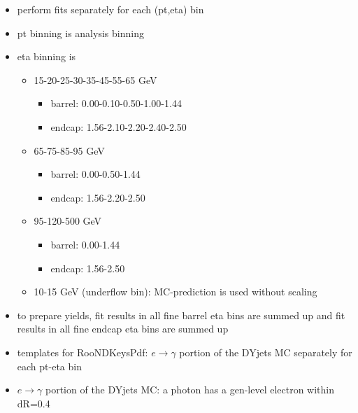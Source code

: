 \begin{itemize}
  \item perform fits separately for each (pt,eta) bin
  \item pt binning is analysis binning
  \item eta binning is 
     \begin{itemize}
        \item 15-20-25-30-35-45-55-65 GeV
           \begin{itemize}
              \item barrel: 0.00-0.10-0.50-1.00-1.44
              \item endcap: 1.56-2.10-2.20-2.40-2.50
           \end{itemize}
        \item 65-75-85-95 GeV
          \begin{itemize}
              \item barrel: 0.00-0.50-1.44
              \item endcap: 1.56-2.20-2.50
           \end{itemize}
        \item 95-120-500 GeV
          \begin{itemize}
              \item barrel: 0.00-1.44
              \item endcap: 1.56-2.50
           \end{itemize}
        \item 10-15 GeV (underflow bin): MC-prediction is used without scaling
     \end{itemize}
  \item to prepare yields, fit results in all fine barrel eta bins are summed up and fit results in all fine endcap eta bins are summed up
  \item templates for RooNDKeysPdf: $e\rightarrow\gamma$ portion of the DYjets MC separately for each pt-eta bin
  \item $e\rightarrow\gamma$ portion of the DYjets MC: a photon has a gen-level electron within dR=0.4 
\end{itemize}






